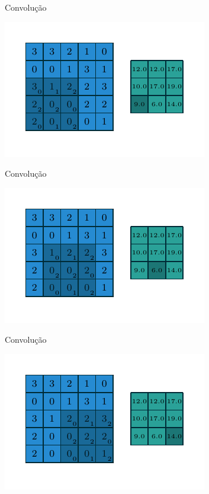 \documentclass[10pt]{beamer}
\begin{document}
\begin{frame}{Convolução}
\begin{center}
\includegraphics[scale=1.5]{images/numerical_no_padding_no_strides_06.pdf}
\end{center}
\end{frame}


\begin{frame}{Convolução}
\begin{center}
\includegraphics[scale=1.5]{images/numerical_no_padding_no_strides_07.pdf}
\end{center}
\end{frame}

\begin{frame}{Convolução}
\begin{center}
\includegraphics[scale=1.5]{images/numerical_no_padding_no_strides_08.pdf}
\end{center}
\end{frame}
\end{document}

